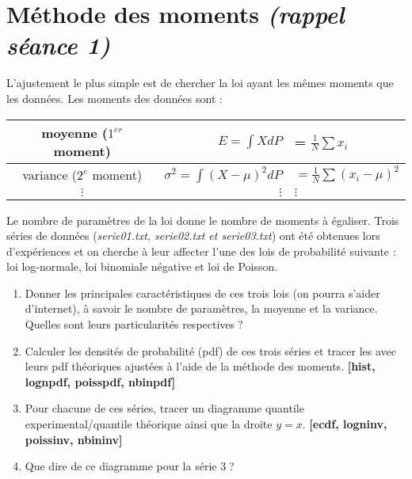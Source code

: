 \documentclass[a4paper]{article}
\begin{document}
\section {Méthode des moments \textit{(rappel séance 1)}}

L'ajustement le plus simple est de chercher la loi ayant les mêmes moments que les données. Les moments des données sont :\\
\begin{center}
\begin{tabular}{c|rl}
moyenne ($1^{er}$ moment) & $E=\int X dP$ &= $\frac 1N \sum x_i$ \\ \hline
variance ($2^{e}$ moment) & $\sigma^2=\int (X-\mu)^{2} dP$ & $= \frac 1N \sum (x_i-\mu)^{2}$ \\
\hline
{\centering $\vdots$} & $\vdots$ & $\vdots$
\end{tabular}

\end{center}
\noindent Le nombre de paramètres de la loi donne le nombre de moments à égaliser. Trois séries de données (\textit{serie01.txt, serie02.txt et serie03.txt}) ont été obtenues lors d'expériences et on cherche à leur affecter l'une des lois de probabilité suivante : loi log-normale, loi binomiale négative et loi de Poisson.\\
 \begin{enumerate}
 \item Donner les principales caractéristiques de ces trois lois (on pourra s'aider d'internet), à savoir le nombre de paramètres, la moyenne et la variance. Quelles sont leurs particularités respectives$\;$?
 \item Calculer les densités de probabilité (pdf) de ces trois séries et tracer les avec leurs pdf théoriques ajustées à l'aide de la méthode des moments.
 \textbf{[hist, lognpdf, poisspdf, nbinpdf]}
 \item Pour chacune de ces séries, tracer un diagramme quantile experimental/quantile théorique ainsi que la droite $y=x$. \textbf{[ecdf, logninv, poissinv, nbininv]}
 \item Que dire de ce diagramme pour la série 3$\;$?
 \end{enumerate}
 
\end{document}
